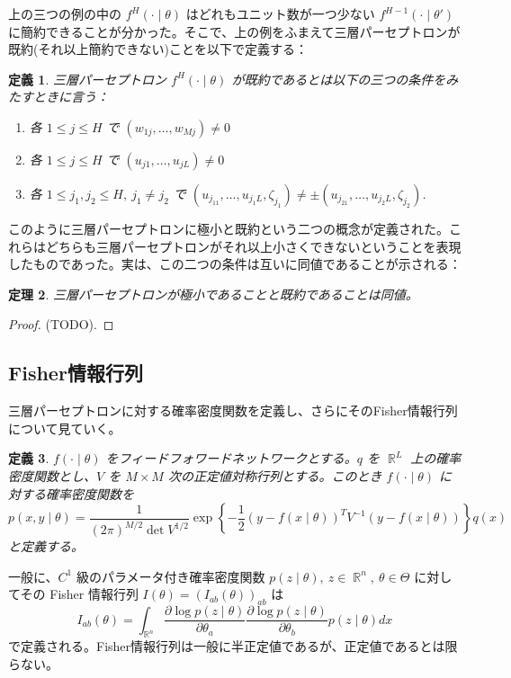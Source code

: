 \documentclass{jsarticle}
\DeclareMathOperator{\R}{\mathbb{R}}
\newtheorem{thm}{定理}[section]
\newtheorem{defn}[thm]{定義}
\begin{document}
上の三つの例の中の $f^H(\cdot\mid\theta)$ はどれもユニット数が一つ少ない $f^{H-1}(\cdot\mid\theta')$ に簡約できることが分かった。そこで、上の例をふまえて三層パーセプトロンが既約(それ以上簡約できない)ことを以下で定義する：
\begin{defn}
  三層パーセプトロン $f^H(\cdot\mid\theta)$ が既約であるとは以下の三つの条件をみたすときに言う：
  \begin{enumerate}
    \item 各 $1 \le j \le H$ で $(w_{1j}, \ldots, w_{Mj}) \neq 0$
    \item 各 $1 \le j \le H$ で $(u_{j1}, \ldots, u_{jL}) \neq 0$
    \item 各 $1 \le j_1, j_2 \le H,\ j_1 \neq j_2$ で $(u_{j_11}, \ldots, u_{j_1L}, \zeta_{j_1}) \neq \pm (u_{j_21}, \ldots, u_{j_2L}, \zeta_{j_2})$.
  \end{enumerate}
\end{defn}
このように三層パーセプトロンに極小と既約という二つの概念が定義された。これらはどちらも三層パーセプトロンがそれ以上小さくできないということを表現したものであった。実は、この二つの条件は互いに同値であることが示される：
\begin{thm}
  三層パーセプトロンが極小であることと既約であることは同値。
\end{thm}
\begin{proof}
  (TODO).
\end{proof}

\subsection{Fisher情報行列}

三層パーセプトロンに対する確率密度関数を定義し、さらにそのFisher情報行列について見ていく。

\begin{defn}
  $f(\cdot\mid\theta)$ をフィードフォワードネットワークとする。$q$ を $\R^L$ 上の確率密度関数とし、$V$ を $M\times M$ 次の正定値対称行列とする。このとき $f(\cdot\mid\theta)$ に対する確率密度関数を
  \[
    p(x,y\mid\theta) = \frac{1}{(2\pi)^{M/2}\det V^{1/2}}\exp\left\{-\frac{1}{2}(y-f(x\mid\theta))^T V^{-1} (y-f(x\mid\theta))\right\}q(x)
  \]
  と定義する。
\end{defn}

一般に、$C^1$ 級のパラメータ付き確率密度関数 $p(z\mid\theta),\ z \in \R^n,\ \theta \in \Theta$ に対してその Fisher 情報行列 $I(\theta) = (I_{ab}(\theta))_{ab}$ は
\[
  I_{ab}(\theta) = \int_{\R^n} \frac{\partial \log p(z\mid\theta)}{\partial \theta_a} \frac{\partial\log p(z\mid\theta)}{\partial \theta_b}p(z\mid\theta)dx
\]
で定義される。Fisher情報行列は一般に半正定値であるが、正定値であるとは限らない。
\end{document}
